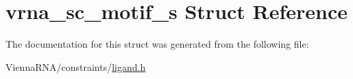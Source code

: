 \hypertarget{structvrna__sc__motif__s}{}\section{vrna\+\_\+sc\+\_\+motif\+\_\+s Struct Reference}
\label{structvrna__sc__motif__s}


The documentation for this struct was generated from the following file\+:\begin{DoxyCompactItemize}
\item 
Vienna\+R\+N\+A/constraints/\mbox{\hyperlink{ligand_8h}{ligand.\+h}}\end{DoxyCompactItemize}
